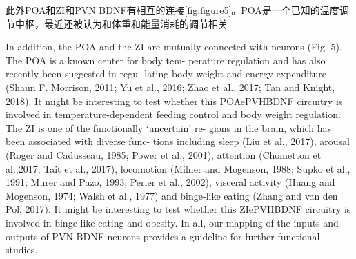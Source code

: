 此外POA和ZI和PVN BDNF有相互的连接\figurename{\ref{fig:figure5}}。POA是一个已知的温度调节中枢，最近还被认为和体重和能量消耗的调节相关\citep{morrison2011central,yu2016glutamatergic,zhao2017hypothalamic,tan2018regulation}


In addition, the POA and the ZI are mutually connected with  neurons (Fig. 5). The POA is a known center for body tem- perature regulation and has also recently been suggested in regu- lating body weight and energy expenditure (Shaun F. Morrison, 2011; Yu et al., 2016; Zhao et al., 2017; Tan and Knight, 2018). It might be interesting to test whether this POAePVHBDNF circuitry is involved in temperature-dependent feeding control and body weight regulation. The ZI is one of the functionally ‘uncertain’ re- gions in the brain, which has been associated with diverse func- tions including sleep (Liu et al., 2017), arousal (Roger and Cadusseau, 1985; Power et al., 2001), attention (Chometton et al.,2017; Tait et al., 2017), locomotion (Milner and Mogenson, 1988; Supko et al., 1991; Murer and Pazo, 1993; Perier et al., 2002), visceral activity (Huang and Mogenson, 1974; Walsh et al., 1977) and binge-like eating (Zhang and van den Pol, 2017). It might be interesting to test whether this ZIePVHBDNF circuitry is involved in binge-like eating and obesity. In all, our mapping of the inputs and outputs of PVN BDNF neurons provides a guideline for further functional studies.


